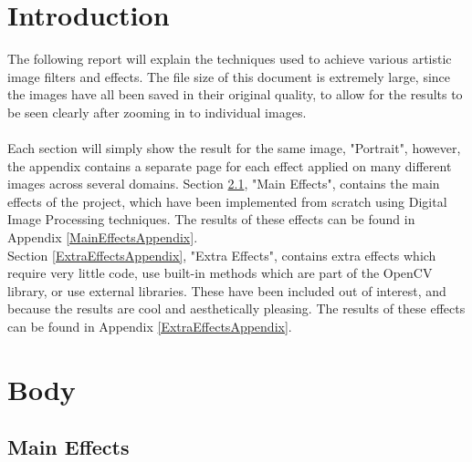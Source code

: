 \documentclass[a4paper,10pt]{report}
\begin{document}
	\tableofcontents
	\newpage
	\listoffigures
	\newpage


	\twocolumn
	\chapter{Introduction}
	The following report will explain the techniques used to achieve various artistic image filters and effects. The file size of this document is extremely large, since the images have all been saved in their original quality, to allow for the results to be seen clearly after zooming in to individual images.\\\\
	Each section will simply show the result for the same image, "Portrait", however, the appendix contains a separate page for each effect applied on many different images across several domains. 
	Section \ref{MainEffectsChapter}, "Main Effects", contains the main effects of the project, which have been implemented from scratch using Digital Image Processing techniques. The results of these effects can be found in Appendix \ref{MainEffectsAppendix}. \\
	Section \ref{ExtraEffectsAppendix}, "Extra Effects", contains extra effects which require very little code, use built-in methods which are part of the OpenCV library, or use external libraries. These have been included out of interest, and because the results are cool and aesthetically pleasing. The results of these effects can be found in Appendix \ref{ExtraEffectsAppendix}.


	\chapter{Body}
	
	\section{Main Effects}\label{MainEffectsChapter}
\end{document}
